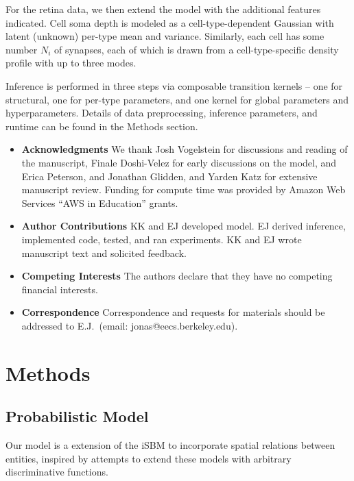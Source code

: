 \documentclass{article}
\begin{document}
For the retina data, we then extend the model with the additional
features indicated. Cell soma depth is modeled as a
cell-type-dependent Gaussian with latent (unknown) per-type mean and
variance. Similarly, each cell has some number $N_i$ of synapses, 
each of which is drawn from a cell-type-specific density profile
with up to three modes.


Inference is performed in three steps via composable transition 
kernels -- one for structural, one for per-type parameters, and
one kernel for global parameters and hyperparameters. Details
of data preprocessing, inference parameters, and runtime can
be found in the Methods section. 

\printbibliography

\begin{itemize}

 \item \textbf{Acknowledgments} We thank Josh Vogelstein for discussions and reading of the manuscript, Finale Doshi-Velez for early discussions on the model, and Erica Peterson, and Jonathan Glidden, and Yarden Katz for extensive manuscript review. Funding for compute time was provided by Amazon Web Services ``AWS in Education'' grants. 
\item \textbf{Author Contributions} KK and EJ developed model. EJ derived inference, implemented code, tested, and ran experiments. KK and EJ wrote manuscript text and solicited feedback. 
 \item \textbf{Competing Interests} The authors declare that they have no
competing financial interests.
 \item \textbf{Correspondence} Correspondence and requests for materials
should be addressed to E.J.~(email: jonas@eecs.berkeley.edu).
\end{itemize}

\newpage
\section*{Methods }

\subsection*{Probabilistic Model}

Our model is a extension of the iSBM
\autocite{Kemp2006a,Xu2006} to incorporate spatial relations between entities,
inspired by attempts to extend these models with arbitrary
discriminative functions\autocite{Murphy2012}.
\end{document}
